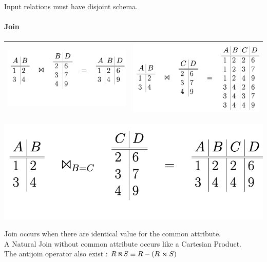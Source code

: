 \documentclass[12pt,a4paper]{article}
\def\ojoin{\setbox0=\hbox{$\bowtie$}%
  \llap{\rule[\ht0]{.25em}{.4pt}}}
\def\antijoin{ \ \mathbin{\ojoin\mkern-12.1mu\Join\mkern-7.7mu\ojoin}}
\begin{document}
Input relations must have disjoint schema.

\paragraph{Join}
\begin{center}
\begin{tabular}{c|c}
	\includegraphics[scale=0.41]{img/img9.png}&
	\includegraphics[scale=0.42]{img/img10.png}\\
	\hline
\end{tabular}
	\includegraphics[scale=0.40]{img/img11.png}
\end{center}
Join occurs when there are identical value for the common attribute.\\
A Natural Join without common attribute occurs like a Cartesian Product.\\
The antijoin operator also exist :
$R \antijoin S \equiv R - (R \Join S)$
\end{document}
